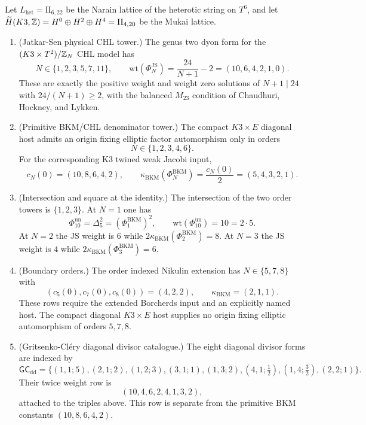 \begin{theorem}
\label{thm:two-tower-unification}
Let \(L_{\mathrm{het}}=\mathrm{II}_{6,22}\) be the Narain lattice of
the heterotic string on \(T^6\), and let
\(\widetilde H(K3,\mathbb{Z})=H^0\oplus H^2\oplus H^4=\mathrm{II}_{4,20}\)
be the Mukai lattice.
\begin{enumerate}[label=\textup{(\roman*)}]
\item \textup{(Jatkar-Sen physical CHL tower.)}
The genus two dyon form for the \((K3\times T^2)/\mathbb{Z}_N\) CHL model has
\[
  N\in \{1,2,3,5,7,11\},\qquad
  \mathrm{wt}(\Phi_N^{\mathrm{JS}})=\frac{24}{N+1}-2
  =(10,6,4,2,1,0).
\]
These are exactly the positive weight and weight zero solutions of
\(N+1\mid 24\) with \(24/(N+1)\ge 2\), with the balanced \(M_{23}\)
condition of Chaudhuri, Hockney, and Lykken.

\item \textup{(Primitive BKM/CHL denominator tower.)}
The compact \(K3\times E\) diagonal host admits an origin fixing
elliptic factor automorphism only in orders
\[
  N\in\{1,2,3,4,6\}.
\]
For the corresponding K3 twined weak Jacobi input,
\[
  c_N(0)=(10,8,6,4,2),\qquad
  \kappa_{\mathrm{BKM}}(\Phi_N^{\mathrm{BKM}})
  =\frac{c_N(0)}2=(5,4,3,2,1).
\]

\item \textup{(Intersection and square at the identity.)}
The intersection of the two order towers is \(\{1,2,3\}\). At \(N=1\)
one has
\[
  \Phi_{10}^{\mathrm{un}}=\Delta_5^2
  =(\Phi_1^{\mathrm{BKM}})^2,\qquad
  \mathrm{wt}(\Phi_{10}^{\mathrm{un}})=10=2\cdot 5.
\]
At \(N=2\) the JS weight is \(6\) while
\(2\kappa_{\mathrm{BKM}}(\Phi_2^{\mathrm{BKM}})=8\). At \(N=3\) the
JS weight is \(4\) while
\(2\kappa_{\mathrm{BKM}}(\Phi_3^{\mathrm{BKM}})=6\).

\item \textup{(Boundary orders.)}
The order indexed Nikulin extension has \(N\in\{5,7,8\}\) with
\[
  (c_5(0),c_7(0),c_8(0))=(4,2,2),\qquad
  \kappa_{\mathrm{BKM}}=(2,1,1).
\]
These rows require the extended Borcherds input and an explicitly
named host. The compact diagonal \(K3\times E\) host supplies no
origin fixing elliptic automorphism of orders \(5,7,8\).

\item \textup{(Gritsenko-Cl\'ery diagonal divisor catalogue.)}
The eight diagonal divisor forms are indexed by
\[
\mathsf{GC}_{\mathrm{dd}}=
\{(1,1;5),(2,1;2),(1,2;3),(3,1;1),(1,3;2),
(4,1;\tfrac12),(1,4;\tfrac32),(2,2;1)\}.
\]
Their twice weight row is
\[
  (10,4,6,2,4,1,3,2),
\]
attached to the triples above. This row is separate from the primitive
BKM constants \((10,8,6,4,2)\).
\end{enumerate}
\end{theorem}

